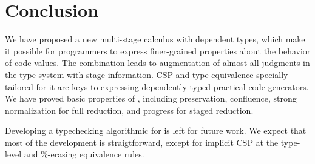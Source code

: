 
\section{Conclusion \label{sec:conclusion}}

We have proposed a new multi-stage calculus \LMD with dependent types,
which make it possible for programmers to express finer-grained
properties about the behavior of code values.  The combination leads
to augmentation of almost all judgments in the type system with stage
information.  CSP and type equivalence specially tailored for it are
keys to expressing dependently typed practical code generators.  We
have proved basic properties of \LMD, including preservation,
confluence, strong normalization for full reduction, and progress for
staged reduction.

Developing a typechecking algorithmic for \LMD is left for future
work.  We expect that most of the development is straigtforward,
except for implicit CSP at the type-level and \%-erasing equivalence
rules.
